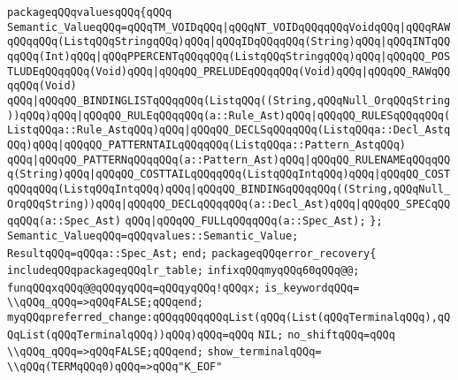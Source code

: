 \verb|packageqQQqvaluesqQQq{qQQq|\newline
\verb|Semantic_ValueqQQq=qQQqTM_VOIDqQQq|\verb#|qQQqNT_VOIDqQQqqQQqVoidqQQq|qQQqRAWqQQqqQQq(ListqQQqStringqQQq)qQQq|qQQqIDqQQqqQQq(String)qQQq|qQQqINTqQQqqQQq(Int)qQQq|qQQqPPERCENTqQQqqQQq(ListqQQqStringqQQq)qQQq|qQQqQQ_POSTLUDEqQQqqQQq(Void)qQQq|qQQqQQ_PRELUDEqQQqqQQq(Void)qQQq|qQQqQQ_RAWqQQqqQQq(Void)#\newline
\verb|qQQq|\verb#|qQQqQQ_BINDINGLISTqQQqqQQq(ListqQQq((String,qQQqNull_OrqQQqString))qQQq)qQQq|qQQqQQ_RULEqQQqqQQq(a::Rule_Ast)qQQq|qQQqQQ_RULESqQQqqQQq(ListqQQqa::Rule_AstqQQq)qQQq|qQQqQQ_DECLSqQQqqQQq(ListqQQqa::Decl_AstqQQq)qQQq|qQQqQQ_PATTERNTAILqQQqqQQq(ListqQQqa::Pattern_AstqQQq)#\newline
\verb|qQQq|\verb#|qQQqQQ_PATTERNqQQqqQQq(a::Pattern_Ast)qQQq|qQQqQQ_RULENAMEqQQqqQQq(String)qQQq|qQQqQQ_COSTTAILqQQqqQQq(ListqQQqIntqQQq)qQQq|qQQqQQ_COSTqQQqqQQq(ListqQQqIntqQQq)qQQq|qQQqQQ_BINDINGqQQqqQQq((String,qQQqNull_OrqQQqString))qQQq|qQQqQQ_DECLqQQqqQQq(a::Decl_Ast)qQQq|qQQqQQ_SPECqQQqqQQq(a::Spec_Ast)#\newline
\verb|qQQq|\verb#|qQQqQQ_FULLqQQqqQQq(a::Spec_Ast);#\newline
\verb|};|\newline
\verb|Semantic_ValueqQQq=qQQqvalues::Semantic_Value;|\newline
\verb|ResultqQQq=qQQqa::Spec_Ast;|\newline
\verb|end;|\newline
\verb|packageqQQqerror_recovery{|\newline
\verb|includeqQQqpackageqQQqlr_table;|\newline
\verb|infixqQQqmyqQQq60qQQq@@;|\newline
\verb|funqQQqxqQQq@@qQQqyqQQq=qQQqyqQQq!qQQqx;|\newline
\verb|is_keywordqQQq=|\newline
\verb|\\qQQq_qQQq=>qQQqFALSE;qQQqend;|\newline
\verb|myqQQqpreferred_change:qQQqqQQqqQQqList(qQQq(List(qQQqTerminalqQQq),qQQqList(qQQqTerminalqQQq))qQQq)qQQq=qQQq|\newline
\verb|NIL;|\newline
\verb|no_shiftqQQq=qQQq|\newline
\verb|\\qQQq_qQQq=>qQQqFALSE;qQQqend;|\newline
\verb|show_terminalqQQq=|\newline
\verb|\\qQQq(TERMqQQq0)qQQq=>qQQq"K_EOF"|\newline
